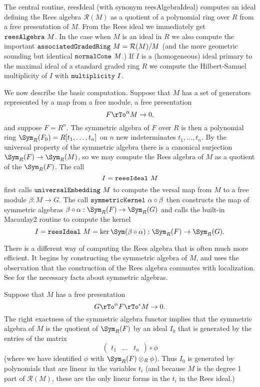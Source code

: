 \documentclass[twoside,12pt, leqno]{amsart}
\def\RR{{\mathcal R}}
\begin{document}
The central routine, reesIdeal (with synonym reesAlgebraIdeal) computes an ideal
defining the Rees algebra $\RR(M)$ as a quotient of a polynomial ring over $R$ from a free presentation of $M$. From the Rees ideal we immediately get
${\tt reesAlgebra}\ M$. In the case when $M$ is an ideal in $R$ we also compute
the important ${\tt associatedGradedRing\ }M = \RR(M)/M$ (and the more geometric sounding but identical ${\tt normalCone\ }M$.)  
If $I$ is a (homogeneous) ideal primary to the
maximal ideal of a standard graded ring $R$ we compute the
Hilbert-Samuel multiplicity of $I$ with ${\tt multiplicity\ }I$.

We now describe the basic computation. Suppose that $M$ has 
a set of generators represented by a map from a free module,
a free presentation
$$
 F\rTo^\alpha M\to 0,
$$
and suppose  $F = R^n$. The symmetric algebra of $F$ over $R$ is then a polynomial ring
$\Sym_R(F_0) = R[t_1,\dots, t_n]$ on $n$ new indeterminates $t_1,\dots, t_n$. By the universal
property of the symmetric algebra there is a canonical surjection
$\Sym_R(F)\rightarrow \Sym_R(M)$, so we may compute the Rees algebra of $M$ as
a quotient of the  $\Sym_R(F)$. The call
$$
I = {\tt reesIdeal}\ M
$$
first calls ${\tt universalEmbedding\ }M$ to compute the versal map from $M$ to a free module $\beta: M\to G$. The call ${\tt symmetricKernel\ } \alpha\circ\beta$  then constructs the map of symmetric algebras $\beta\circ \alpha:\Sym_R(F)\to \Sym_R(G)$ and  calls
 the built-in Macaulay2 routine to compute the kernel 
$$
I = {\tt reesIdeal\ }M = \ker \Sym(\beta\circ\alpha): \Sym_R(F) \to \Sym_R(G).
$$

There is a different way of computing the Rees algebra that is often much more efficient. It begins by constructing the symmetric algebra of $M$, and uses the observation that the construction of the Rees algebra commutes with localization. See \cite[Appendix 2]{E} for the necessary facts about symmetric algebras.

Suppose that $M$ has a free presentation
$$
G\rTo^\alpha F\rTo^\epsilon M\to 0.
$$
The right exactness of the symmetric algebra functor implies that the symmetric algebra of $M$ is the quotient of $\Sym_R(F)$ by an ideal $I_0$ that is
generated by the
entries of the matrix
$$
\begin{pmatrix}
 t_1&\dots&t_n
 \end{pmatrix}
 \circ \phi
$$
(where we have identified $\phi$ with $\Sym_R(F)\otimes_R\phi$).
Thus $I_0$ is generated by polynomials that are linear in the variables $t_i$ (and because
$M$ is the degree 1 part of $\RR(M)$, these are the only linear forms in the $t_i$ in the
Rees ideal.)
\end{document}
